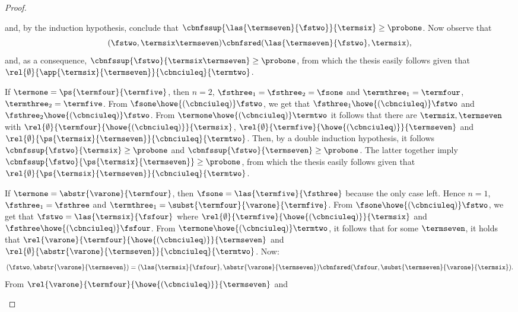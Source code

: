 \begin{proof}
\begin{varitemize}
\begin{varitemize}
$$      $$
      and, by the induction hypothesis, conclude that
      $\cbnfssup{\las{\termseven}{\fstwo}}{\termsix}\geq\probone$. Now
      observe that
      $$
      (\fstwo,\termsix\termseven)\cbnfsred(\las{\termseven}{\fstwo},\termsix),
      $$
      and, as a consequence,
      $\cbnfssup{\fstwo}{\termsix\termseven}\geq\probone$, from which the
      thesis easily follows given that
      $\rel{\emptyset}{\app{\termsix}{\termseven}}{\cbnciuleq}{\termtwo}$.
    \item If $\termone=\ps{\termfour}{\termfive}$, then $n=2$,
      $\fsthree_1=\fsthree_2=\fsone$ and $\termthree_1=\termfour$,
      $\termthree_2=\termfive$. From $\fsone\howe{(\cbnciuleq)}\fstwo$, we
      get that $\fsthree_1\howe{(\cbnciuleq)}\fstwo$ and
      $\fsthree_2\howe{(\cbnciuleq)}\fstwo$. From
      $\termone\howe{(\cbnciuleq)}\termtwo$ it follows that there are
      $\termsix,\termseven$ with
      $\rel{\emptyset}{\termfour}{\howe{(\cbnciuleq)}}{\termsix}$,
      $\rel{\emptyset}{\termfive}{\howe{(\cbnciuleq)}}{\termseven}$ and
      $\rel{\emptyset}{\ps{\termsix}{\termseven}}{\cbnciuleq}{\termtwo}$. Then,
      by a double induction hypothesis, it follows
      $\cbnfssup{\fstwo}{\termsix}\geq\probone$ and
      $\cbnfssup{\fstwo}{\termseven}\geq\probone$. The latter together
      imply $\cbnfssup{\fstwo}{\ps{\termsix}{\termseven}}\geq\probone$,
      from which the thesis easily follows given that
      $\rel{\emptyset}{\ps{\termsix}{\termseven}}{\cbnciuleq}{\termtwo}$.
    \item If $\termone=\abstr{\varone}{\termfour}$, then
      $\fsone=\las{\termfive}{\fsthree}$ because the only case left. Hence
      $n=1$, $\fsthree_1=\fsthree$ and
      $\termthree_1=\subst{\termfour}{\varone}{\termfive}$. From
      $\fsone\howe{(\cbnciuleq)}\fstwo$, we get that
      $\fstwo=\las{\termsix}{\fsfour}$ where
      $\rel{\emptyset}{\termfive}{\howe{(\cbnciuleq)}}{\termsix}$ and
      $\fsthree\howe{(\cbnciuleq)}\fsfour$. From
      $\termone\howe{(\cbnciuleq)}\termtwo$, it follows that for some
      $\termseven$, it holds that
      $\rel{\varone}{\termfour}{\howe{(\cbnciuleq)}}{\termseven}$ and
      $\rel{\emptyset}{\abstr{\varone}{\termseven}}{\cbnciuleq}{\termtwo}$. Now:
      \begin{equation}\label{eq:fsred}
        (\fstwo,\abstr{\varone}{\termseven})=(\las{\termsix}{\fsfour},\abstr{\varone}{\termseven})
        \cbnfsred(\fsfour,\subst{\termseven}{\varone}{\termsix}).
      \end{equation}
      From $\rel{\varone}{\termfour}{\howe{(\cbnciuleq)}}{\termseven}$ and

\end{varitemize}
\end{varitemize}
\end{proof}
